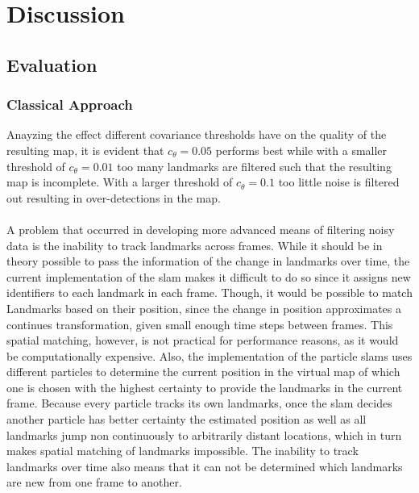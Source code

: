 \graphicspath{{Chapter/Figs/evaluation/}}
\chapter{Discussion}

\section{Evaluation}
\subsection{Classical Approach}
Anayzing the effect different covariance thresholds have on the quality of the resulting map, it is evident that $c_\theta=0.05$ performs best while with a smaller threshold of $c_\theta=0.01$ too many landmarks are filtered such that the resulting map is incomplete. With a larger threshold of $c_\theta=0.1$ too little noise is filtered out resulting in over-detections in the map.\\
\\
A problem that occurred in developing more advanced means of filtering noisy data is the inability to track landmarks across frames. While it should be in theory possible to pass the information of the change in landmarks over time, the current implementation of the \ac{slam} makes it difficult to do so since it assigns new identifiers to each landmark in each frame. Though, it would be possible to match Landmarks based on their position, since the change in position approximates a continues transformation, given small enough time steps between frames. This spatial matching, however, is not practical for performance reasons, as it would be computationally expensive. Also, the implementation of the particle \ac{slam}s uses different particles to determine the current position in the virtual map of which one is chosen with the highest certainty to provide the landmarks in the current frame. Because every particle tracks its own landmarks, once the \ac{slam} decides another particle has better certainty the estimated position as well as all landmarks jump non continuously to arbitrarily distant locations, which in turn makes spatial matching of landmarks impossible. The inability to track landmarks over time also means that it can not be determined which landmarks are new from one frame to another.
